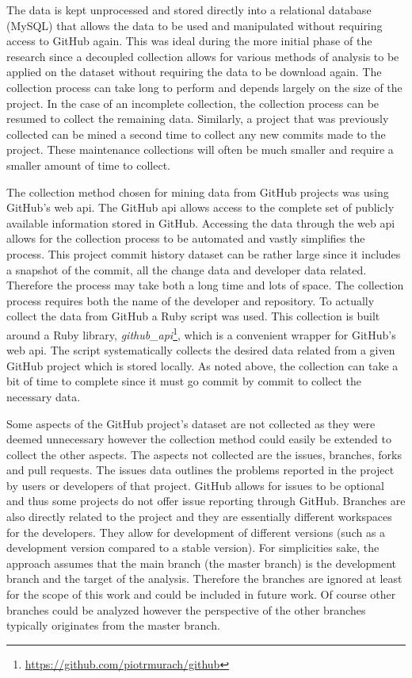 The data is kept unprocessed and stored directly into a relational database (MySQL) that allows the data to be used and manipulated without requiring access to GitHub again.  This was ideal during the more initial phase of the research since a decoupled collection allows for various methods of analysis to be applied on the dataset without requiring the data to be download again. The collection process can take long to perform and depends largely on the size of the project. In the case of an incomplete collection, the collection process can be resumed to collect the remaining data. Similarly, a project that was previously collected can be mined a second time to collect any new commits made to the project. These maintenance collections will often be much smaller and require a smaller amount of time to collect.


The collection method chosen for mining data from GitHub projects was using GitHub's web \gls{api}. The GitHub \gls{api} allows access to the complete set of publicly available information stored in GitHub. Accessing the data through the web \gls{api} allows for the collection process to be automated and vastly simplifies the process. This project commit history dataset can be rather large since it includes a snapshot of the commit, all the change data and developer data related. Therefore the process may take both a long time and lots of space. The collection process requires both the name of the developer and repository. To actually collect the data from GitHub a Ruby script was used. This collection is built around a Ruby library, \textit{github\_api}\footnote{\url{https://github.com/piotrmurach/github}}, which is a convenient wrapper for GitHub's web \gls{api}. The script systematically collects the desired data related from a given GitHub project which is stored locally. As noted above, the collection can take a bit of time to complete since it must go commit by commit to collect the necessary data.

Some aspects of the GitHub project's dataset are not collected as they were deemed unnecessary however the collection method could easily be extended to collect the other aspects. The aspects not collected are the issues, branches, forks and pull requests. The issues data outlines the problems reported in the project by users or developers of that project. GitHub allows for issues to be optional and thus some projects do not offer issue reporting through GitHub. Branches are also directly related to the project and they are essentially different workspaces for the developers. They allow for development of different versions (such as a development version compared to a stable version). For simplicities sake, the approach assumes that the main branch (the master branch) is the development branch and the target of the analysis. Therefore the branches are ignored at least for the scope of this work and could be included in future work. Of course other branches could be analyzed however the perspective of the other branches typically originates from the master branch.

